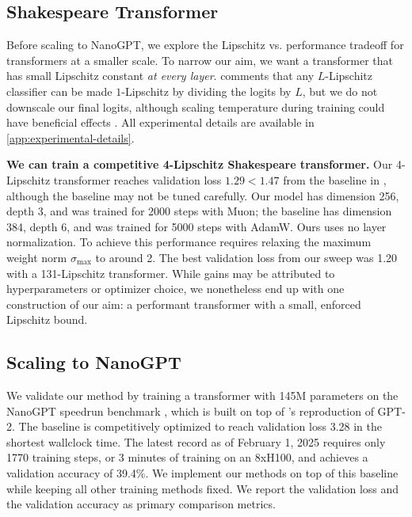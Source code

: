 \subsection{Shakespeare Transformer}
\label{subsec:shakespeare}

Before scaling to NanoGPT, we explore the Lipschitz vs. performance tradeoff for transformers at a smaller scale. To narrow our aim, we want a transformer that has small Lipschitz constant \textit{at every layer}. \citet{bethune2022pay} comments that any $L$-Lipschitz classifier can be made $1$-Lipschitz by dividing the logits by $L$, but we do not downscale our final logits, although scaling temperature during training could have beneficial effects \citep{agarwala2020temperaturechecktheorypractice}. All experimental details are available in \cref{app:experimental-details}.

\textbf{We can train a competitive 4-Lipschitz Shakespeare transformer.} Our 4-Lipschitz transformer reaches validation loss $1.29 < 1.47$ from the baseline in \citet{karpathy_nanoGPT}, although the baseline may not be tuned carefully. Our model has dimension 256, depth 3, and was trained for 2000 steps with Muon; the baseline has dimension 384, depth 6, and was trained for 5000 steps with AdamW. Ours uses no layer normalization. To achieve this performance requires relaxing the maximum weight norm $\sigma_\text{max}$ to around 2. The best validation loss from our sweep was 1.20 with a 131-Lipschitz transformer. While gains may be attributed to hyperparameters or optimizer choice, we nonetheless end up with one construction of our aim: a performant transformer with a small, enforced Lipschitz bound.

\subsection{Scaling to NanoGPT}
\label{subsec:nanogpt}

We validate our method by training a transformer with 145M parameters on the NanoGPT speedrun benchmark \citep{modded_nanogpt_2024}, which is built on top of \citep{karpathy_nanoGPT}'s reproduction of GPT-2. The baseline is competitively optimized to reach validation loss 3.28 in the shortest wallclock time. The latest record as of February 1, 2025 requires only 1770 training steps, or 3 minutes of training on an 8xH100, and achieves a validation accuracy of 39.4\%. We implement our methods on top of this baseline while keeping all other training methods fixed. We report the validation loss and the validation accuracy as primary comparison metrics.

